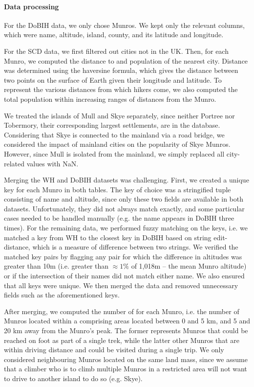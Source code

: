 \documentclass[11pt,a4paper]{article}
\begin{document}
\paragraph{Data processing}
For the DoBIH data, we only chose Munros. We kept only the relevant columns, which were name, altitude, island, county, and its latitude and longitude.

For the SCD data, we first filtered out cities not in the UK. Then, for each Munro, we computed the distance to and population of the nearest city. Distance was determined using the haversine formula, which gives the distance between two points on the surface of Earth given their longitude and latitude. To represent the various distances from which hikers come, we also computed the total population within increasing ranges of distances from the Munro.

We treated the islands of Mull and Skye separately, since neither Portree nor Tobermory, their corresponding largest settlements, are in the database. Considering that Skye is connected to the mainland via a road bridge, we considered the impact of mainland cities on the popularity of Skye Munros. However, since Mull is isolated from the mainland, we simply replaced all city-related values with NaN.

Merging the WH and DoBIH datasets was challenging. First, we created a unique key for each Munro in both tables. The key of choice was a stringified tuple consisting of name and altitude, since only these two fields are available in both datasets. Unfortunately, they did not always match exactly, and some particular cases needed to be handled manually (e.g. the name  appears in DoBIH three times). For the remaining data, we performed fuzzy matching on the keys, i.e. we matched a key from WH to the closest key in DoBIH based on string edit-distance, which is a measure of difference between two strings. We verified the matched key pairs by flagging any pair for which the difference in altitudes was greater than 10m (i.e. greater than $\approx1\%$ of 1,018m – the mean Munro altitude) or if the intersection of their names did not match either name. We also ensured that all keys were unique. We then merged the data and removed unnecessary fields such as the aforementioned keys.

After merging, we computed the number of  for each Munro, i.e. the number of Munros located within a  comprising areas located between 0 and 5 km, and 5 and 20 km away from the Munro's peak. The former represents Munros that could be reached on foot as part of a single trek, while the latter other Munros that are within driving distance and could be visited during a single trip. We only considered neighbouring Munros located on the same land mass, since we assume that a climber who is to climb multiple Munros in a restricted area will not want to drive to another island to do so (e.g. Skye).
\end{document}
